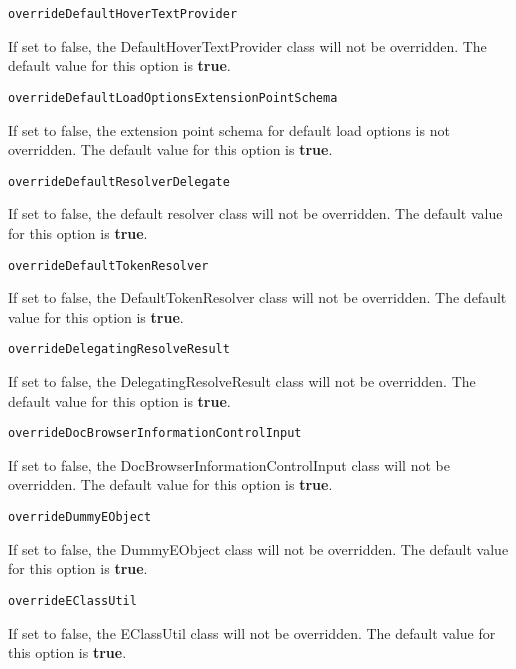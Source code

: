\noindent\texttt{overrideDefaultHoverTextProvider}
\begin{myindentpar}{1cm}
If set to false, the DefaultHoverTextProvider class will not be overridden. The default value for this option is \textbf{true}.
\end{myindentpar}

\noindent\texttt{overrideDefaultLoadOptionsExtensionPointSchema}
\begin{myindentpar}{1cm}
If set to false, the extension point schema for default load options is not overridden. The default value for this option is \textbf{true}.
\end{myindentpar}

\noindent\texttt{overrideDefaultResolverDelegate}
\begin{myindentpar}{1cm}
If set to false, the default resolver class will not be overridden. The default value for this option is \textbf{true}.
\end{myindentpar}

\noindent\texttt{overrideDefaultTokenResolver}
\begin{myindentpar}{1cm}
If set to false, the DefaultTokenResolver class will not be overridden. The default value for this option is \textbf{true}.
\end{myindentpar}

\noindent\texttt{overrideDelegatingResolveResult}
\begin{myindentpar}{1cm}
If set to false, the DelegatingResolveResult class will not be overridden. The default value for this option is \textbf{true}.
\end{myindentpar}

\noindent\texttt{overrideDocBrowserInformationControlInput}
\begin{myindentpar}{1cm}
If set to false, the DocBrowserInformationControlInput class will not be overridden. The default value for this option is \textbf{true}.
\end{myindentpar}

\noindent\texttt{overrideDummyEObject}
\begin{myindentpar}{1cm}
If set to false, the DummyEObject class will not be overridden. The default value for this option is \textbf{true}.
\end{myindentpar}

\noindent\texttt{overrideEClassUtil}
\begin{myindentpar}{1cm}
If set to false, the EClassUtil class will not be overridden. The default value for this option is \textbf{true}.
\end{myindentpar}

